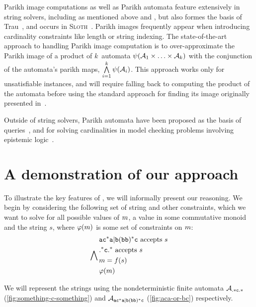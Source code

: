 \documentclass[acmsmall,review,anonymous,screen]{acmart}\settopmatter{printfolios=true,printccs=false,printacmref=true}
\theoremstyle{definition}
\begin{document}
Parikh image computations as well as Parikh automata \cite{parikh-automata}
feature extensively in string solvers, including as mentioned above \Ostrich{}
and \OstrichPlus{} \cite{ostrich,ostrich-plus}, but also formes the basis of
Trau~\cite{trau-pldi}, and occurs in \textsc{Sloth}~\cite{sloth}. Parikh images
frequently appear when introducing cardinality constraints like length or string
indexing. The state-of-the-art approach to handling Parikh image computation is
to over-approximate the Parikh image of a product of $k$~automata
$\operatorname{\psi}(\mathcal{A}_1 \times \ldots \times \mathcal{A}_k)$ with the
conjunction of the automata's parikh maps, $\bigwedge\limits_{i=1} ^{k}
\operatorname{\psi}(\mathcal{A}_i)$. This approach works only for unsatisfiable instances,
and will require falling back to computing the product of the automata before
using the standard approach for finding its image originally presented in~\cite{generate-parikh-image}.

Outside of string solvers, Parikh automata have been proposed as the basis of
queries~\cite{graph-queries}, and for solving cardinalities in model checking
problems involving epistemic logic~\cite{epistemic-logic}.

\section{A demonstration of our approach}\label{sec:motivation}

To illustrate the key features of \Calculus, we will informally present our
reasoning. We begin by considering the following set of string and other
constraints, which we want to solve for all possible values of $m$,
a value in some commutative monoid  and the string $s$, where
$\varphi(m)$ is some set of constraints on $m$:
\begin{equation*}
  \bigwedge\limits_{} \begin{aligned}
  & \mathtt{ac^*a|b(bb)^*c} \text{ accepts } s\\
  & \mathtt{.^*c.^*} \text{ accepts } s \\
  & m = f(s) \\
  & \varphi(m)
  \end{aligned}
 \end{equation*}

We will represent the strings using the nondeterministic finite automata
 $\mathcal{A}_{\mathtt{.*c.*}}{}$ (\cref{fig:something-c-something}) and $\mathcal{A}_{\mathtt{ac^*a|b(bb)^*c}}{}$
 (\cref{fig:aca-or-bc}) respectively.
\end{document}
